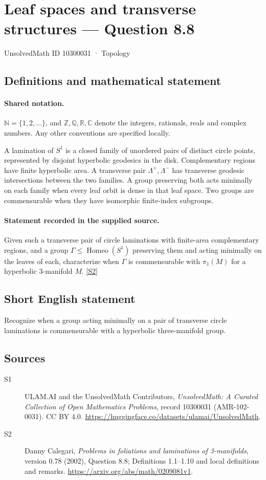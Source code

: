 \documentclass[11pt]{article}
\newcommand{\sref}[2]{\hyperlink{source:#1:#2}{[S#2]}}
\begin{document}
\setcounter{section}{10300030}
\section{Leaf spaces and transverse structures — Question 8.8}\label{10300031}
{\small\sffamily UnsolvedMath ID 10300031 · Topology}
\subsection{Definitions and mathematical statement}

\paragraph{Shared notation.}$\mathbb N=\{1,2,\ldots\}$, and $\mathbb Z,\mathbb Q,\mathbb R,\mathbb C$ denote the integers, rationals, reals and complex numbers. Any other conventions are specified locally.


A lamination of $S^1$ is a closed family of unordered pairs of distinct circle points, represented by disjoint hyperbolic geodesics in the disk. Complementary regions have finite hyperbolic area. A transverse pair $\Lambda^+,\Lambda^-$ has transverse geodesic intersections between the two families. A group preserving both acts minimally on each family when every leaf orbit is dense in that leaf space. Two groups are commensurable when they have isomorphic finite-index subgroups.
\paragraph{Statement recorded in the supplied source.}
Given such a transverse pair of circle laminations with finite-area complementary regions, and a group $\Gamma\le\operatorname{Homeo}(S^1)$ preserving them and acting minimally on the leaves of each, characterize when $\Gamma$ is commensurable with $\pi_1(M)$ for a hyperbolic $3$-manifold $M$. \sref{10300031}{2}
\subsection{Short English statement}
Recognize when a group acting minimally on a pair of transverse circle laminations is commensurable with a hyperbolic three-manifold group.
\subsection{Sources}
\begin{description}
\item[\hypertarget{source:10300031:1}{S1}] ULAM.AI and the UnsolvedMath Contributors, \emph{UnsolvedMath: A Curated Collection of Open Mathematics Problems}, record 10300031 (AMR-102-0031). CC BY 4.0. \url{https://huggingface.co/datasets/ulamai/UnsolvedMath}.
\item[\hypertarget{source:10300031:2}{S2}] Danny Calegari, \emph{Problems in foliations and laminations of 3-manifolds}, version 0.78 (2002), Question 8.8; Definitions 1.1--1.10 and local definitions and remarks. \url{https://arxiv.org/abs/math/0209081v1}.
\end{description}
\label{end:10300031}
\end{document}
